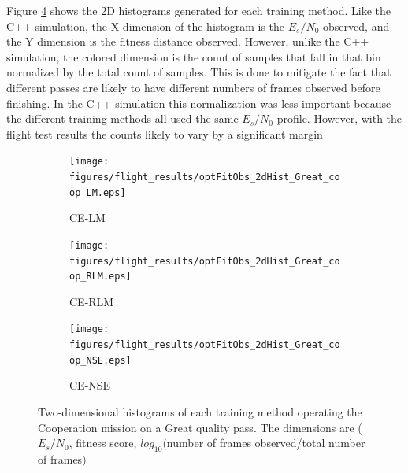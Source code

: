 \clearpage


\par Figure \ref{fig:coop_great_2dhist} shows the 2D histograms generated for each training method. Like the C++ simulation, the X dimension of the histogram is the $E_s/N_0$ observed, and the Y dimension is the fitness distance observed. However, unlike the C++ simulation, the colored dimension is the count of samples that fall in that bin normalized by the total count of samples. This is done to mitigate the fact that different passes are likely to have different numbers of frames observed before finishing. In the C++ simulation this normalization was less important because the different training methods all used the same $E_s/N_0$ profile. However, with the flight test results the counts likely to vary by a significant margin

\begin{figure}[ht]
\begin{subfigure}{0.30\linewidth}
	\centering
	\texttt{[image: figures/flight\_results/optFitObs\_2dHist\_Great\_coop\_LM.eps]}
	\caption{CE-LM}
	\label{fig:coopGreat2dHist_LM}
\end{subfigure}\hfill%
\begin{subfigure}{0.30\linewidth}
	\centering
	\texttt{[image: figures/flight\_results/optFitObs\_2dHist\_Great\_coop\_RLM.eps]}
	\caption{CE-RLM}
	\label{fig:coopGreat2dHist_RLM}
\end{subfigure}\hfill%
\begin{subfigure}{0.30\linewidth}
	\centering
	\texttt{[image: figures/flight\_results/optFitObs\_2dHist\_Great\_coop\_NSE.eps]}
	\caption{CE-NSE}
	\label{fig:coopGreat2dHist_NSE}
\end{subfigure}
\caption{Two-dimensional histograms of each training method operating the Cooperation mission on a Great quality pass. The dimensions are ($E_s/N_0$, fitness score, $log_10($number of frames observed/total number of frames$)$} \label{fig:coop_great_2dhist}
\end{figure}

